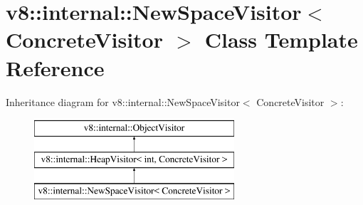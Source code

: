 \hypertarget{classv8_1_1internal_1_1NewSpaceVisitor}{}\section{v8\+:\+:internal\+:\+:New\+Space\+Visitor$<$ Concrete\+Visitor $>$ Class Template Reference}
\label{classv8_1_1internal_1_1NewSpaceVisitor}
Inheritance diagram for v8\+:\+:internal\+:\+:New\+Space\+Visitor$<$ Concrete\+Visitor $>$\+:\begin{figure}[H]
\begin{center}
\leavevmode
\includegraphics[height=3.000000cm]{classv8_1_1internal_1_1NewSpaceVisitor}
\end{center}
\end{figure}
